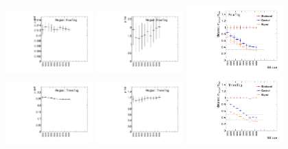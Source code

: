 \begin{figure}[htbp!]
\begin{center}
\includegraphics[angle=270, width=0.3\textwidth]{./figures/boosted/Appendix_SB/FourTag_muqcdSB.pdf}
\includegraphics[angle=270, width=0.3\textwidth]{./figures/boosted/Appendix_SB/FourTag_mutopSB.pdf}
\includegraphics[angle=270, width=0.33\textwidth]{./figures/boosted/Appendix_SB/data_est_FourTag_sigma_compareSB.pdf}\\
\includegraphics[angle=270, width=0.3\textwidth]{./figures/boosted/Appendix_SB/ThreeTag_muqcdSB.pdf}
\includegraphics[angle=270, width=0.3\textwidth]{./figures/boosted/Appendix_SB/ThreeTag_mutopSB.pdf}
\includegraphics[angle=270, width=0.33\textwidth]{./figures/boosted/Appendix_SB/data_est_ThreeTag_sigma_compareSB.pdf}\\

\end{center}
\end{figure}
